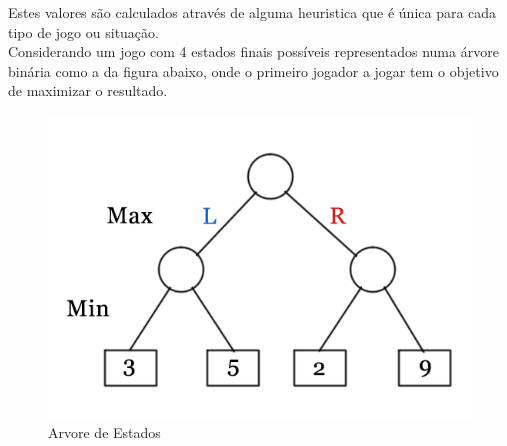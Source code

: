 \documentclass[]{article}
\begin{document}
	Estes valores são calculados através de alguma heuristica que é única para cada tipo de jogo ou situação.\\
	
	Considerando um jogo com 4 estados finais possíveis representados numa árvore binária como a da figura abaixo, onde o primeiro jogador a jogar tem o objetivo de maximizar o resultado.
	
	\begin{figure}[H]
	\includegraphics[width=\linewidth]{gtt.png}
	\caption{Arvore de Estados \cite{gfg}}
	\label{fig:arvore1}
	\end{figure}
\end{document}
